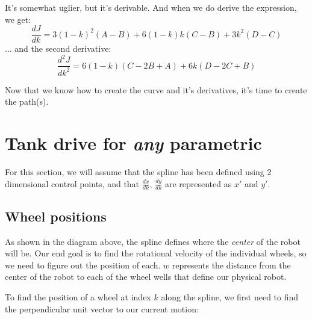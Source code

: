 \documentclass[12pt, english]{article}
\begin{document}
It's somewhat uglier, but it's derivable. And when we do derive the expression, we get:
\[
   \frac{dJ}{dk}=3(1-k)^{2}(A-B)+6(1-k)k(C-B)+3k^{2}(D-C)
\]
... and the second derivative:
\[
	\frac{d^2J}{dk^2}=6(1-k)(C-2B+A)+6k( D-2C+B)
\]

Now that we know how to create the curve and it's derivatives, it's time to create the path(s).


\section{Tank drive for \textit{any} parametric}

For this section, we will assume that the spline has been defined using 2 dimensional control points, and that $\frac{dx}{dk}$, $\frac{dy}{dk}$ are represented as $x'$ and $y'$.

\subsection{Wheel positions}
\begin{center}
\end{center}

As shown in the diagram above, the spline defines where the \textit{center} of the robot will be. Our end goal is to find the rotational velocity of the individual wheels, so we need to figure out the position of each. $w$ represents the distance from the center of the robot to each of the wheel wells that define our physical robot.
\par
To find the position of a wheel at index $k$ along the spline, we first need to find the perpendicular unit vector to our current motion:
\end{document}
